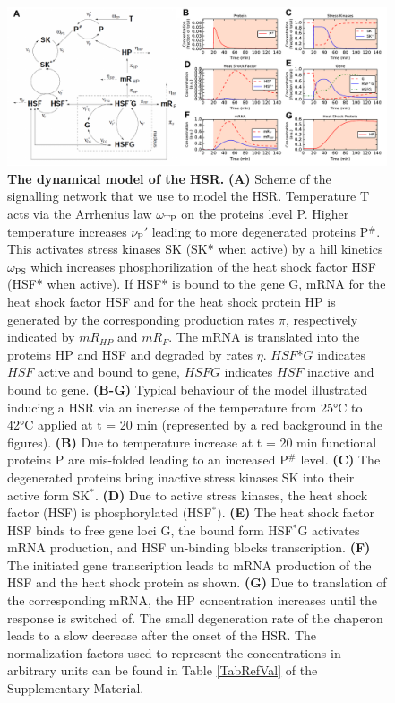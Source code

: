 \documentclass[oneside, 10pt, a4paper, twocolumn]{article}
\begin{document}
\begin{figure}
\centering
\includegraphics[width=\textwidth]{Figure1_Paper.pdf}
\caption{\small{\textbf{The dynamical model of the HSR.} \textbf{(A)} Scheme of the signalling network that we use to model the HSR. Temperature T acts via %
the Arrhenius law $\omega_\text{TP}$ on the proteins level P. 
Higher temperature increases $\nu_\text{P}'$ leading to more degenerated proteins P$^\#$. 
This activates stress kinases SK (SK* when active) by a hill kinetics $\omega_\text{PS}$ which increases phosphorilization of the heat shock factor HSF (HSF* when active). 
If HSF* is bound to the gene G, mRNA for the heat shock factor HSF and for the heat shock protein HP is generated by the corresponding production rates $\pi$, respectively indicated by $mR_{HP}$ and $mR_{F}$. 
The mRNA is translated into the proteins HP and HSF and degraded by rates $\eta$. $HSF$*$G$ indicates $HSF$ active and bound to gene, $HSFG$ indicates $HSF$ inactive and bound to gene. \textbf{(B-G)} Typical behaviour of the model illustrated inducing a HSR via an increase of the temperature from 25°C to 42°C applied at t = 20 min (represented by a red background in the figures). \textbf{(B)} Due to temperature increase at t = 20 min functional proteins P are mis-folded leading to an increased P$^\#$ level. \textbf{(C)} The degenerated proteins bring inactive stress kinases SK into their active form SK$^*$. \textbf{(D)} Due to active stress kinases, the heat shock factor (HSF) is phosphorylated (HSF$^*$). \textbf{(E)} The heat shock factor HSF binds to free gene loci G, the bound form HSF$^*$G activates mRNA production, and HSF un-binding blocks transcription. \textbf{(F)} The initiated gene transcription leads to mRNA production of the HSF and the heat shock protein as shown. \textbf{(G)} Due to translation of the corresponding mRNA, the HP concentration increases until the response is switched of. The small degeneration rate of the chaperon leads to a slow decrease after the onset of the HSR.
The normalization factors used to represent the concentrations in arbitrary units can be found in Table \ref{TabRefVal} of the Supplementary Material.}}
  \label{Figure1label}
\end{figure}
\end{document}
